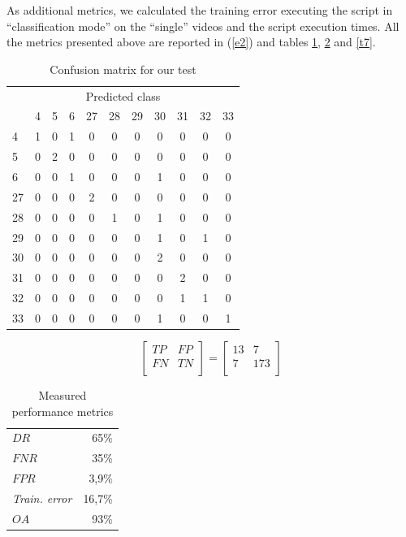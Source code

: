 \documentclass[letterpaper, 11pt, conference]{ieeeconf} %
\begin{document}
As additional metrics, we calculated the training error executing the script in ``classification mode'' on the ``single'' videos and the script execution times. All the metrics presented above are reported in (\ref{e2}) and tables \ref{t5}, \ref{t6} and \ref{t7}.

\begin{table}[h]
\centering
\begin{tabular}{l|*{10}{c}}
\multicolumn{11}{c}{Predicted class}\\
	& 4 & 5 & 6 & 27 & 28 & 29 & 30 & 31 & 32 & 33\\
	\hline
	4 & 1 & 0 & 1 & 0 & 0 & 0 & 0 & 0 & 0 & 0\\
	5 & 0 & 2 & 0 & 0 & 0 & 0 & 0 & 0 & 0 & 0\\
	6 & 0 & 0 & 1 & 0 & 0 & 0 & 1 & 0 & 0 & 0\\
	27 & 0 & 0 & 0 & 2 & 0 & 0 & 0 & 0 & 0 & 0\\
	28 & 0 & 0 & 0 & 0 & 1 & 0 & 1 & 0 & 0 & 0\\
	29 & 0 & 0 & 0 & 0 & 0 & 0 & 1 & 0 & 1 & 0\\
	30 & 0 & 0 & 0 & 0 & 0 & 0 & 2 & 0 & 0 & 0\\
	31 & 0 & 0 & 0 & 0 & 0 & 0 & 0 & 2 & 0 & 0\\
	32 & 0 & 0 & 0 & 0 & 0 & 0 & 0 & 1 & 1 & 0\\
	33 & 0 & 0 & 0 & 0 & 0 & 0 & 1 & 0 & 0 & 1\\
\end{tabular}
\caption{Confusion matrix for our test} \label{t5}
\end{table}

\begin{equation} \label{e2}
\begin{bmatrix}
	TP & FP\\
	FN & TN\\
\end{bmatrix}
=
\begin{bmatrix}
	13 & 7\\
	7 & 173\\
\end{bmatrix}
\end{equation}

\begin{table}[h]
\centering
\begin{tabular}{lr}
	$DR$ & 65\%\\
	$FNR$ & 35\%\\
	$FPR$ & 3,9\%\\
	\emph{Train. error} & 16,7\%\\
	$OA$ & 93\%\\
\end{tabular}
\caption{Measured performance metrics} \label{t6}
\vspace{-1.5em}
\end{table}
\end{document}

